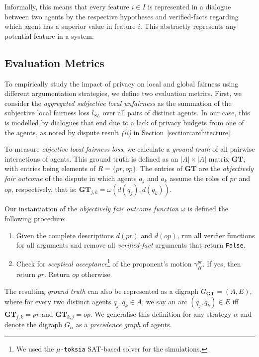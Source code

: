 \documentclass[acmsmall]{custom-arxiv}  %
\begin{document}
Informally, this means that every feature $i \in I$ is represented in a dialogue between two agents by the respective hypotheses and verified-facts regarding which agent has a superior value in feature $i$. This abstractly represents any potential feature in a system.

\subsection{Evaluation Metrics} \label{subsection:evaluation}

To empirically study the impact of privacy on local and global fairness using different argumentation strategies, we define two evaluation metrics. First, we consider the \textit{aggregated subjective local unfairness} as the summation of the subjective local fairness loss $l_{SL}$ over all pairs of distinct agents. In our case, this is modelled by dialogues that end due to a lack of privacy budgets from one of the agents, as noted by dispute result \textit{(ii)} in Section~\ref{section:architecture}.

To measure \textit{objective local fairness loss}, we calculate a \textit{ground truth} of all pairwise interactions of agents. This ground truth is defined as an $|A| \times |A|$ matrix $\mathbf{GT}$, with entries being elements of $R = \{pr, op\}$. The entries of $\mathbf{GT}$ are the \textit{objectively fair outcome} of the dispute in which agents $a_j$ and $a_k$ assume the roles of $pr$ and $op$, respectively, that is: $\mathbf{GT}_{j,k} = \omega(d(q_j), d(q_k))$.

Our instantiation of the \textit{objectively fair outcome function} $\omega$ is defined the following procedure:
\begin{enumerate}
    \item Given the complete descriptions $d(pr)$ and $d(op)$, run all verifier functions for all arguments and remove all \textit{verified-fact} arguments that return \texttt{False}.
    \item Check for \textit{sceptical acceptance}\footnote{We used the $\mu$\texttt{-toksia} \citep{Niskanen2020-toksia:Reasoner} SAT-based solver for the simulations.} of the proponent's motion $\gamma_H^{pr}$. If yes, then return $pr$. Return $op$ otherwise.
\end{enumerate}

The resulting \textit{ground truth} can also be represented as a digraph $G_{\mathbf{GT}} = (A, E)$, where for every two distinct agents $q_j, q_k \in A$, we say an arc $(q_j, q_k) \in E$ iff $\mathbf{GT}_{j,k} = pr$ and $\mathbf{GT}_{k,j} = op$. We generalise this definition for any strategy $\alpha$ and denote the digraph $G_{\alpha}$ as a \textit{precedence graph} of agents.
\end{document}
